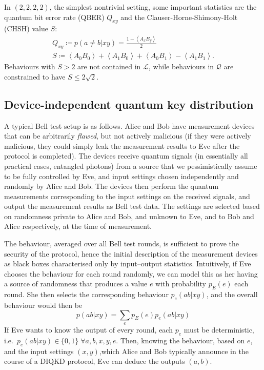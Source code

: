 \documentclass[10pt, a4paper]{article}
\numberwithin{equation}{section} %
\theoremstyle{definition}
\theoremstyle{plain}
\newcommand{\?}{\mathrel{?}} %
\newcommand{\angleb}[1]{\left\langle #1 \right\rangle} %
\newcommand{\Ls}{\mathcal{L}}
\newcommand{\Qs}{\mathcal{Q}}
\begin{document}
    In \((2,2,2,2)\), the simplest nontrivial setting, some important statistics are the quantum bit error rate (QBER) \(Q_{xy}\) and the Clauser-Horne-Shimony-Holt (CHSH) value \(S\):
    \begin{gather}
      Q_{xy} \coloneqq p(a \neq b|xy) = \frac{1-\angleb{A_x B_y}}{2} \\
      S \coloneqq \angleb{A_0 B_0} + \angleb{A_1 B_0} + \angleb{A_0 B_1} - \angleb{A_1 B_1}.
    \end{gather}
    Behaviours with \(S > 2\) are not contained in \(\Ls\), while behaviours in \(\Qs\) are constrained to have \(S \leq 2\sqrt{2}\).

    \subsection{Device-independent quantum key distribution}\label{sec:pre_diqkd}

    A typical Bell test setup is as follows. Alice and Bob have measurement devices that can be arbitrarily \emph{flawed}, but not actively malicious (if they were actively malicious, they could simply leak the measurement results to Eve after the protocol is completed). The devices receive quantum signals (in essentially all practical cases, entangled photons) from a source that we pessimistically assume to be fully controlled by Eve, and input settings chosen independently and randomly by Alice and Bob. The devices then perform the quantum measurements corresponding to the input settings on the received signals, and output the measurement results as Bell test data. The settings are selected based on randomness private to Alice and Bob, and unknown to Eve, and to Bob and Alice respectively, at the time of measurement.

    The behaviour, averaged over all Bell test rounds, is sufficient to prove the security of the protocol, hence the initial description of the measurement devices as black boxes characterised only by input--output statistics. Intuitively, if Eve chooses the behaviour for each round randomly, we can model this as her having a source of randomness that produces a value \(e\) with probability \(p_E(e)\) each round. She then selects the corresponding behaviour \(p_e(ab|xy)\), and the overall behaviour would then be
    \begin{equation}\label{eqn:finethm}
      p(ab|xy) = \sum_e p_E(e) p_e(ab|xy)
    \end{equation}
    If Eve wants to know the output of every round, each \(p_e\) must be deterministic, i.e.\ \(p_e(ab|xy) \in \{0, 1\}\;\forall a,b,x,y,e\). Then, knowing the behaviour, based on \(e\), and the input settings \((x,y)\),which Alice and Bob typically announce in the course of a DIQKD protocol, Eve can deduce the outputs \((a,b)\).
\end{document}
